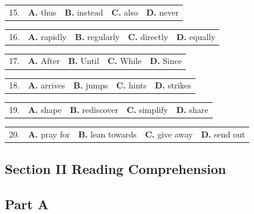 \documentclass[UTF8,11pt]{ctexart}
\begin{document}
\noindent\begin{tabularx}{\linewidth}{@{}lXXXX@{}}15. & \textbf{A.} thus & \textbf{B.} instead & \textbf{C.} also & \textbf{D.} never\\\end{tabularx}\par

\noindent\begin{tabularx}{\linewidth}{@{}lXXXX@{}}16. & \textbf{A.} rapidly & \textbf{B.} regularly & \textbf{C.} directly & \textbf{D.} equally\\\end{tabularx}\par

\noindent\begin{tabularx}{\linewidth}{@{}lXXXX@{}}17. & \textbf{A.} After & \textbf{B.} Until & \textbf{C.} While & \textbf{D.} Since\\\end{tabularx}\par

\noindent\begin{tabularx}{\linewidth}{@{}lXXXX@{}}18. & \textbf{A.} arrives & \textbf{B.} jumps & \textbf{C.} hints & \textbf{D.} strikes\\\end{tabularx}\par

\noindent\begin{tabularx}{\linewidth}{@{}lXXXX@{}}19. & \textbf{A.} shape & \textbf{B.} rediscover & \textbf{C.} simplify & \textbf{D.} share\\\end{tabularx}\par

\noindent\begin{tabularx}{\linewidth}{@{}lXXXX@{}}20. & \textbf{A.} pray for & \textbf{B.} lean towards & \textbf{C.} give away & \textbf{D.} send out\\\end{tabularx}\par

\subsection*{\textbf{Section II Reading Comprehension}}


\subsection*{\textbf{Part A}}
\end{document}
